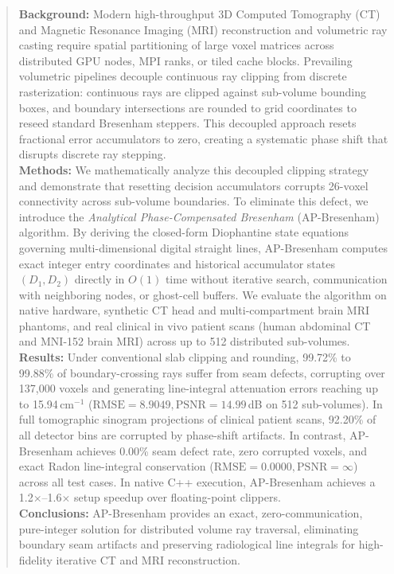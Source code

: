 \documentclass[11pt]{article}
\begin{document}
\begin{abstract}
\noindent \textbf{Background:} Modern high-throughput 3D Computed Tomography (CT) and Magnetic Resonance Imaging (MRI) reconstruction and volumetric ray casting require spatial partitioning of large voxel matrices across distributed GPU nodes, MPI ranks, or tiled cache blocks. Prevailing volumetric pipelines decouple continuous ray clipping from discrete rasterization: continuous rays are clipped against sub-volume bounding boxes, and boundary intersections are rounded to grid coordinates to reseed standard Bresenham steppers. This decoupled approach resets fractional error accumulators to zero, creating a systematic phase shift that disrupts discrete ray stepping.\\
\textbf{Methods:} We mathematically analyze this decoupled clipping strategy and demonstrate that resetting decision accumulators corrupts 26-voxel connectivity across sub-volume boundaries. To eliminate this defect, we introduce the \emph{Analytical Phase-Compensated Bresenham} (AP-Bresenham) algorithm. By deriving the closed-form Diophantine state equations governing multi-dimensional digital straight lines, AP-Bresenham computes exact integer entry coordinates and historical accumulator states $(D_1, D_2)$ directly in $O(1)$ time without iterative search, communication with neighboring nodes, or ghost-cell buffers. We evaluate the algorithm on native hardware, synthetic CT head and multi-compartment brain MRI phantoms, and real clinical in vivo patient scans (human abdominal CT and MNI-152 brain MRI) across up to 512 distributed sub-volumes.\\
\textbf{Results:} Under conventional slab clipping and rounding, 99.72\% to 99.88\% of boundary-crossing rays suffer from seam defects, corrupting over 137,000 voxels and generating line-integral attenuation errors reaching up to 15.94\,cm$^{-1}$ ($\mathrm{RMSE} = 8.9049, \mathrm{PSNR} = 14.99$\,dB on 512 sub-volumes). In full tomographic sinogram projections of clinical patient scans, 92.20\% of all detector bins are corrupted by phase-shift artifacts. In contrast, AP-Bresenham achieves 0.00\% seam defect rate, zero corrupted voxels, and exact Radon line-integral conservation ($\mathrm{RMSE} = 0.0000, \mathrm{PSNR} = \infty$) across all test cases. In native C++ execution, AP-Bresenham achieves a 1.2$\times$--1.6$\times$ setup speedup over floating-point clippers.\\
\textbf{Conclusions:} AP-Bresenham provides an exact, zero-communication, pure-integer solution for distributed volume ray traversal, eliminating boundary seam artifacts and preserving radiological line integrals for high-fidelity iterative CT and MRI reconstruction.
\end{abstract}
\end{document}
